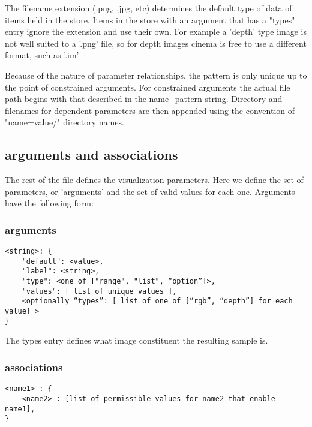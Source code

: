 \documentclass{article}
\begin{document}
The filename extension (.png, .jpg, etc) determines the default type of data of items held in the store. Items in the store with an argument that has a "types" entry ignore the extension and use their own. For example a 'depth' type image is not well suited to a '.png' file, so for depth images cinema is free to use a different format, such as '.im'.

Because of the nature of parameter relationships, the pattern is only unique up to the point of constrained arguments. For constrained arguments the actual file path begins with that described in the name\_pattern string. Directory and filenames for dependent parameters are then appended using the convention of "name=value/" directory names.

\subsection{arguments and associations}
                    
The rest of the file defines the visualization parameters. Here we define the set of parameters, or 'arguments' and the set of valid values for each one. Arguments have the following form:
                
\subsubsection{arguments}

\begin{verbatim}
<string>: {
    "default": <value>,
    "label": <string>,
    "type": <one of ["range", "list", “option”]>,
    "values": [ list of unique values ],
    <optionally “types”: [ list of one of [“rgb”, “depth”] for each value] >
} 
\end{verbatim}

The types entry defines what image constituent the resulting sample is.

\subsubsection{associations}
\begin{verbatim}
<name1> : {
    <name2> : [list of permissible values for name2 that enable name1], 
}
\end{verbatim}
\end{document}

